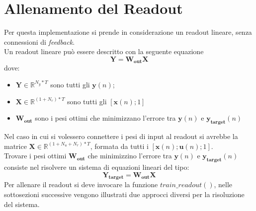 \section{Allenamento del Readout}
Per questa implementazione si prende in considerazione un readout lineare, senza connessioni di \textit{feedback}.\\
Un readout lineare può essere descritto con la seguente equazione
\begin{equation} \label{eq:readout}
\mathbf{Y}= \mathbf{W_{out}X}
\end{equation}
dove:
\begin{itemize}
	\item $\mathbf{Y} \in \mathbb{R}^{N_y*T}$ sono tutti gli $\mathbf{y}(n)$;
	\item $\mathbf{X} \in \mathbb{R}^{(1+N_r)*T}$ sono tutti gli $[\mathbf{x}(n);1]$
	\item $\mathbf{W_{out}}$ sono i pesi ottimi che minimizzano l'errore tra $\mathbf{y}(n)$ e $\mathbf{y_{target}}(n)$
\end{itemize}
Nel caso in cui si volessero connettere i pesi di input al readout si avrebbe la matrice $\mathbf{X} \in \mathbb{R}^{(1+N_u+N_r)*T}$, formata da tutti i $[\mathbf{x}(n);\mathbf{u}(n);1]$.\\
Trovare i pesi ottimi $\mathbf{W_{out}}$ che minimizzino l'errore tra $\mathbf{y}(n)$ e $\mathbf{y_{target}}(n)$ consiste nel risolvere un sistema di equazioni lineari del tipo:
\begin{equation} \label{eq:readout_targ}
\mathbf{Y_{target}}= \mathbf{W_{out}X}
\end{equation}
Per allenare il readout si deve invocare la funzione $\mathit{train\_readout()}$, nelle sottosezioni successive vengono illustrati due approcci diversi per la risoluzione del sistema.

